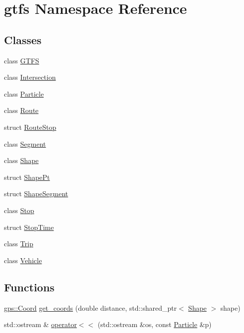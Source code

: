 \hypertarget{namespacegtfs}{}\section{gtfs Namespace Reference}
\label{namespacegtfs}
\subsection*{Classes}
\begin{DoxyCompactItemize}
\item 
class \hyperlink{classgtfs_1_1GTFS}{G\+T\+FS}
\item 
class \hyperlink{classgtfs_1_1Intersection}{Intersection}
\item 
class \hyperlink{classgtfs_1_1Particle}{Particle}
\item 
class \hyperlink{classgtfs_1_1Route}{Route}
\item 
struct \hyperlink{structgtfs_1_1RouteStop}{Route\+Stop}
\item 
class \hyperlink{classgtfs_1_1Segment}{Segment}
\item 
class \hyperlink{classgtfs_1_1Shape}{Shape}
\item 
struct \hyperlink{structgtfs_1_1ShapePt}{Shape\+Pt}
\item 
struct \hyperlink{structgtfs_1_1ShapeSegment}{Shape\+Segment}
\item 
class \hyperlink{classgtfs_1_1Stop}{Stop}
\item 
struct \hyperlink{structgtfs_1_1StopTime}{Stop\+Time}
\item 
class \hyperlink{classgtfs_1_1Trip}{Trip}
\item 
class \hyperlink{classgtfs_1_1Vehicle}{Vehicle}
\end{DoxyCompactItemize}
\subsection*{Functions}
\begin{DoxyCompactItemize}
\item 
\hyperlink{classgps_1_1Coord}{gps\+::\+Coord} \hyperlink{namespacegtfs_af4dc0313dc585ab27351aac9bfca32f6}{get\+\_\+coords} (double distance, std\+::shared\+\_\+ptr$<$ \hyperlink{classgtfs_1_1Shape}{Shape} $>$ shape)
\item 
std\+::ostream \& \hyperlink{namespacegtfs_a3a0b93a57343e447187095cfbbf0af9a}{operator$<$$<$} (std\+::ostream \&os, const \hyperlink{classgtfs_1_1Particle}{Particle} \&p)
\end{DoxyCompactItemize}


